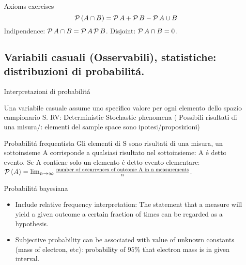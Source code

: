 \begin{wordonframe}{Axioms exercises}
\[\operatorname{\mathcal{P}}{(A\cap B)}=\operatorname{\mathcal{P}}{A}+\operatorname{\mathcal{P}}{B}-\operatorname{\mathcal{P}}{A\cup B}\]
Indipendence: $\operatorname{\mathcal{P}}{A\cap B}=\operatorname{\mathcal{P}}{A}\operatorname{\mathcal{P}}{B}$.
Disjoint: $\operatorname{\mathcal{P}}{A\cap B}=0$.
\end{wordonframe}

\subsection{Variabili casuali (Osservabili), statistiche: distribuzioni di probabilit\'a.}

\begin{frame}{Interpretazioni di probabilit\'a}
\begin{block}{Una variabile casuale assume uno specifico valore per ogni elemento dello spazio campionario S.}
RV: \sout{Deterministic} Stochastic phenomena ( Possibili risultati di una misura/: elementi del sample space sono ipotesi/proposizioni)
\end{block}
\begin{block}{Probabilit\'a frequentista}
Gli elementi di S sono risultati di una misura, un sottoinsieme A corrisponde a qualsiasi risultato nel sottoinsieme: A \'e detto evento. Se A contiene solo un elemento \'e detto evento elementare: $\operatorname{\mathcal{P}}{(A)}=\lim_{n\to\infty}\frac{\text{number of occurrences of outcome A in n measurements}}{n}$.
\end{block}
\begin{block}{Probabilit\'a bayesiana}

\begin{itemize}
\item Include relative frequency interpretation: The statement that a measure will yield a given outcome a certain fraction of times can be regarded as a hypothesis.
\item Subjective probability can be associated with value of unknown constants (mass of electron, etc): probability of $95\%$ that electron mass is in given interval.
\end{itemize}
\end{block}
\end{frame}

